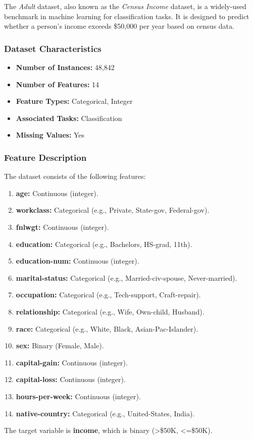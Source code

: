 \documentclass{article}
\begin{document}
The \textit{Adult} dataset, also known as the \textit{Census Income} dataset, is a widely-used benchmark in machine learning for classification tasks. It is designed to predict whether a person's income exceeds \$50,000 per year based on census data.

\subsubsection{Dataset Characteristics}

\begin{itemize}
    \item \textbf{Number of Instances:} 48,842
    \item \textbf{Number of Features:} 14
    \item \textbf{Feature Types:} Categorical, Integer
    \item \textbf{Associated Tasks:} Classification
    \item \textbf{Missing Values:} Yes
\end{itemize}

\subsubsection{Feature Description}

The dataset consists of the following features:
\begin{enumerate}
    \item \textbf{age:} Continuous (integer).
    \item \textbf{workclass:} Categorical (e.g., Private, State-gov, Federal-gov).
    \item \textbf{fnlwgt:} Continuous (integer).
    \item \textbf{education:} Categorical (e.g., Bachelors, HS-grad, 11th).
    \item \textbf{education-num:} Continuous (integer).
    \item \textbf{marital-status:} Categorical (e.g., Married-civ-spouse, Never-married).
    \item \textbf{occupation:} Categorical (e.g., Tech-support, Craft-repair).
    \item \textbf{relationship:} Categorical (e.g., Wife, Own-child, Husband).
    \item \textbf{race:} Categorical (e.g., White, Black, Asian-Pac-Islander).
    \item \textbf{sex:} Binary (Female, Male).
    \item \textbf{capital-gain:} Continuous (integer).
    \item \textbf{capital-loss:} Continuous (integer).
    \item \textbf{hours-per-week:} Continuous (integer).
    \item \textbf{native-country:} Categorical (e.g., United-States, India).
\end{enumerate}
The target variable is \textbf{income}, which is binary (>\$50K, <=\$50K).
\end{document}

